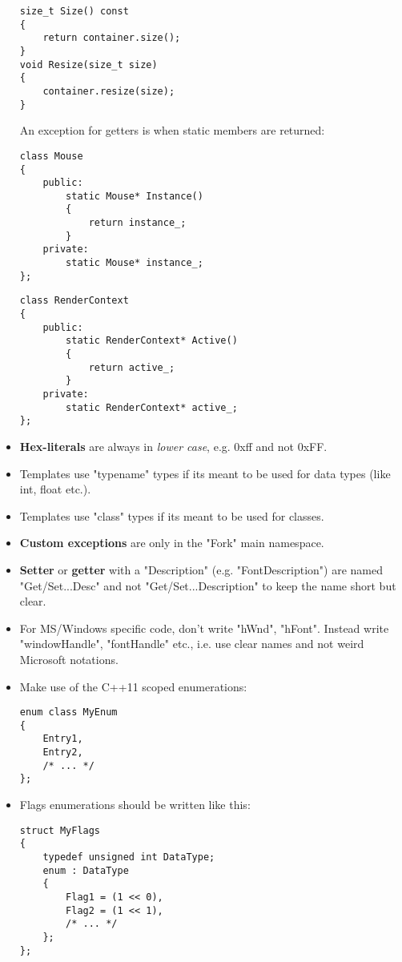 \documentclass{article}
\begin{document}
\begin{itemize}
\begin{lstlisting}
size_t Size() const
{
	return container.size();
}
void Resize(size_t size)
{
	container.resize(size);
}
\end{lstlisting}

An exception for getters is when static members are returned:

\begin{lstlisting}
class Mouse
{
	public:
		static Mouse* Instance()
		{
			return instance_;
		}
	private:
		static Mouse* instance_;
};
\end{lstlisting}
\begin{lstlisting}
class RenderContext
{
	public:
		static RenderContext* Active()
		{
			return active_;
		}
	private:
		static RenderContext* active_;
};
\end{lstlisting}

\item
\textbf{Hex-literals} are always in \textit{lower case}, e.g. 0xff and not 0xFF.

\item
Templates use "typename" types if its meant to be used for data types (like int, float etc.).

\item
Templates use "class" types if its meant to be used for classes.

\item
\textbf{Custom exceptions} are only in the "Fork" main namespace.

\item
\textbf{Setter} or \textbf{getter} with a "Description" (e.g. "FontDescription") are named "Get/Set...Desc" and not "Get/Set...Description" to keep the name short but clear.

\item
For MS/Windows specific code, don't write "hWnd", "hFont". Instead write "windowHandle", "fontHandle" etc., i.e. use clear names and not weird Microsoft notations.

\item
Make use of the C++11 scoped enumerations:

\begin{lstlisting}
enum class MyEnum
{
	Entry1,
	Entry2,
	/* ... */
};
\end{lstlisting}

\item
Flags enumerations should be written like this:

\begin{lstlisting}
struct MyFlags
{
	typedef unsigned int DataType;
	enum : DataType
	{
		Flag1 = (1 << 0),
		Flag2 = (1 << 1),
		/* ... */
	};
};


\end{lstlisting}
\end{itemize}
\end{document}
